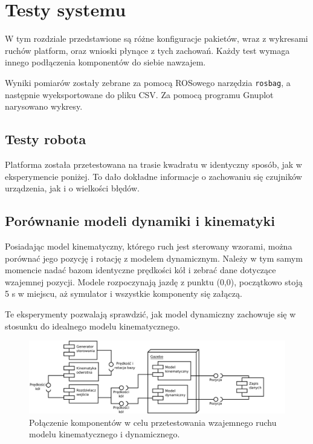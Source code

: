 \chapter{Testy systemu}
\label{sec:tests}
W tym rozdziale przedstawione są różne konfiguracje pakietów, wraz z wykresami ruchów platform, oraz wnioski płynące z tych zachowań.
Każdy test wymaga innego podłączenia komponentów do siebie nawzajem.

Wyniki pomiarów zostały zebrane za pomocą ROSowego narzędzia \texttt{rosbag}, a następnie wyeksportowane do pliku CSV. Za pomocą programu Gnuplot narysowano wykresy.

\section{Testy robota}
	Platforma została przetestowana na trasie kwadratu w identyczny sposób, jak w eksperymencie poniżej.
	To dało dokładne informacje o zachowaniu się czujników urządzenia, jak i o wielkości błędów.

\section{Porównanie modeli dynamiki i kinematyki}
	Posiadając model kinematyczny, którego ruch jest sterowany wzorami, można porównać jego pozycję i rotację z modelem dynamicznym.
	Należy w tym samym momencie nadać bazom identyczne prędkości kół i zebrać dane dotyczące wzajemnej pozycji.
	Modele rozpoczynają jazdę z punktu (0,0), początkowo stoją 5 s w miejscu, aż symulator i wszystkie komponenty się załączą.
	
	Te eksperymenty pozwalają sprawdzić, jak model dynamiczny zachowuje się w stosunku do idealnego modelu kinematycznego.
	
	\begin{figure}[H]
		\centering
		\includegraphics[width=\textwidth]{uml/gramofon.pdf}
			\caption{Połączenie komponentów w celu przetestowania wzajemnego ruchu modelu kinematycznego i dynamicznego.}
		\label{uml:gramofon}
	\end{figure}
	
